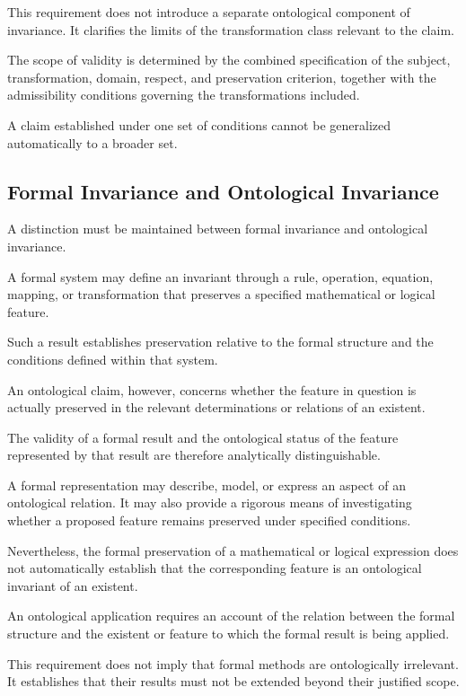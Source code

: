 This requirement does not introduce
a separate ontological component of
invariance. It clarifies the limits
of the transformation class relevant
to the claim.

The scope of validity is determined
by the combined specification of the
subject, transformation, domain, respect,
and preservation criterion, together
with the admissibility conditions
governing the transformations included.

A claim established under one set of
conditions cannot be generalized
automatically to a broader set.

\subsection{Formal Invariance and Ontological Invariance}

A distinction must be maintained between
formal invariance and ontological invariance.

A formal system may define an invariant
through a rule, operation, equation,
mapping, or transformation that preserves
a specified mathematical or logical
feature.

Such a result establishes preservation
relative to the formal structure and
the conditions defined within that
system.

An ontological claim, however, concerns
whether the feature in question is
actually preserved in the relevant
determinations or relations of an
existent.

The validity of a formal result and
the ontological status of the feature
represented by that result are therefore
analytically distinguishable.

A formal representation may describe,
model, or express an aspect of an
ontological relation. It may also
provide a rigorous means of investigating
whether a proposed feature remains
preserved under specified conditions.

Nevertheless, the formal preservation
of a mathematical or logical expression
does not automatically establish that
the corresponding feature is an
ontological invariant of an existent.

An ontological application requires
an account of the relation between
the formal structure and the existent
or feature to which the formal result
is being applied.

This requirement does not imply that
formal methods are ontologically
irrelevant. It establishes that their
results must not be extended beyond
their justified scope.

